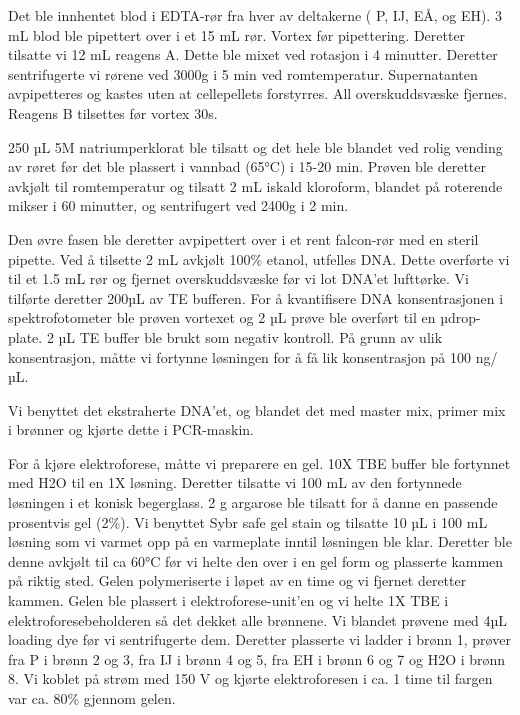 \documentclass[
  letterpaper,
  DIV=11,
  numbers=noendperiod]{scrreprt}
\begin{document}
Det ble innhentet blod i EDTA-rør fra hver av deltakerne ( P, IJ, EÅ, og
EH). 3 mL blod ble pipettert over i et 15 mL rør. Vortex før
pipettering. Deretter tilsatte vi 12 mL reagens A. Dette ble mixet ved
rotasjon i 4 minutter. Deretter sentrifugerte vi rørene ved 3000g i 5
min ved romtemperatur. Supernatanten avpipetteres og kastes uten at
cellepellets forstyrres. All overskuddsvæske fjernes. Reagens B
tilsettes før vortex 30s.

250 µL 5M natriumperklorat ble tilsatt og det hele ble blandet ved rolig
vending av røret før det ble plassert i vannbad (65°C) i 15-20 min.
Prøven ble deretter avkjølt til romtemperatur og tilsatt 2 mL iskald
kloroform, blandet på roterende mikser i 60 minutter, og sentrifugert
ved 2400g i 2 min.

Den øvre fasen ble deretter avpipettert over i et rent falcon-rør med en
steril pipette. Ved å tilsette 2 mL avkjølt 100\% etanol, utfelles DNA.
Dette overførte vi til et 1.5 mL rør og fjernet overskuddsvæske før vi
lot DNA'et lufttørke. Vi tilførte deretter 200µL av TE bufferen. For å
kvantifisere DNA konsentrasjonen i spektrofotometer ble prøven vortexet
og 2 µL prøve ble overført til en µdrop-plate. 2 µL TE buffer ble brukt
som negativ kontroll. På grunn av ulik konsentrasjon, måtte vi fortynne
løsningen for å få lik konsentrasjon på 100 ng/µL.

Vi benyttet det ekstraherte DNA'et, og blandet det med master mix,
primer mix i brønner og kjørte dette i PCR-maskin.

For å kjøre elektroforese, måtte vi preparere en gel. 10X TBE buffer ble
fortynnet med H2O til en 1X løsning. Deretter tilsatte vi 100 mL av den
fortynnede løsningen i et konisk begerglass. 2 g argarose ble tilsatt
for å danne en passende prosentvis gel (2\%). Vi benyttet Sybr safe gel
stain og tilsatte 10 µL i 100 mL løsning som vi varmet opp på en
varmeplate inntil løsningen ble klar. Deretter ble denne avkjølt til ca
60°C før vi helte den over i en gel form og plasserte kammen på riktig
sted. Gelen polymeriserte i løpet av en time og vi fjernet deretter
kammen. Gelen ble plassert i elektroforese-unit'en og vi helte 1X TBE i
elektroforesebeholderen så det dekket alle brønnene. Vi blandet prøvene
med 4µL loading dye før vi sentrifugerte dem. Deretter plasserte vi
ladder i brønn 1, prøver fra P i brønn 2 og 3, fra IJ i brønn 4 og 5,
fra EH i brønn 6 og 7 og H2O i brønn 8. Vi koblet på strøm med 150 V og
kjørte elektroforesen i ca. 1 time til fargen var ca. 80\% gjennom
gelen.
\end{document}
